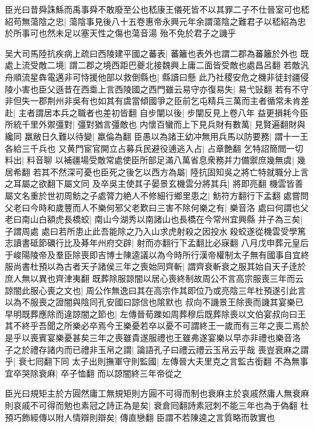 臣光曰昔舜誅鯀而禹事舜不敢廢至公也嵇康王儀死皆不以其罪二子不仕晉室可也嵇紹苟無蕩陰之忠|{
	蕩陰事見後八十五卷惠帝永興元年余謂蕩陰之難君子以嵇紹為忠於所事可也然未足以塞天性之傷也蕩音湯}
殆不免於君子之譏乎

吴大司馬陸抗疾病上疏曰西陵建平國之蕃表|{
	蕃籬也表外也謂二郡為蕃籬於外也}
既處上流受敵二境|{
	謂二郡之境西距巴夔北接魏興上庸二面皆受敵也處昌呂翻}
若敵汎舟順流星犇電邁非可恃援他部以救倒縣也|{
	縣讀曰懸}
此乃社稷安危之機非徒封疆侵陵小害也臣父遜昔在西埀上言西陵國之西門雖云易守亦復易失|{
	易弋䜴翻}
若有不守非但失一郡荆州非吳有也如其有虞當傾國爭之臣前乞屯精兵三萬而主者循常未肯差赴|{
	主者謂居本兵之職者也差初皆翻}
自步闡以後|{
	步闡反見上卷八年}
益更損耗今臣所統千里外禦彊對|{
	彊對猶言彊敵也}
内懷百蠻而上下見兵財有數萬|{
	見賢遍翻財與纔同}
羸敝日久難以待變|{
	羸倫為翻}
臣愚以為諸王幼冲無用兵馬以防要務|{
	謂十一王各給三千兵也}
又黄門宦官開立占募兵民避役逋逃入占|{
	占章艶翻}
乞特詔簡閲一切料出|{
	料音聊}
以補疆場受敵常處使臣所部足滿八萬省息衆務并力備禦庶幾無虞|{
	幾居希翻}
若其不然深可憂也臣死之後乞以西方為屬|{
	陸抗固知吳之將亡特就職分上言之耳屬之欲翻下屬文同}
及卒吳主使其子晏景玄機雲分將其兵|{
	將即亮翻}
機雲皆善屬文名重於世初周魴之子處膂力絶人不修細行鄉里患之|{
	魴符方翻行下孟翻}
處嘗問父老曰今時和歲豐而人不樂何邪父老歎曰三害不除何樂之有|{
	樂音洛}
處曰何謂也父老曰南山白額虎長橋蛟|{
	南山今湖秀以南諸山也長橋在今常州宜興縣}
并子為三矣|{
	子謂周處}
處曰若所患止此吾能除之乃入山求虎射殺之因投水殺蛟遂從機雲受學篤志讀書砥節礪行比及朞年州府交辟|{
	射而亦翻行下孟翻比必寐翻}
八月戊申葬元皇后于峻陽陵帝及羣臣除喪即吉博士陳逵議以為今時所行漢帝權制太子無有國事自宜終服尚書杜預以為古者天子諸侯三年之喪始同齊斬|{
	謂齊衰斬衰之服其始自天子逹於庶人無以異也齊津夷翻}
既葬除服諒闇以居心喪終制故周公不言高宗服喪三年而云諒闇此服心喪之文也|{
	周公作無逸曰其在高宗作其即位乃或亮陰三年杜預遂引此言以為不服喪之證闇與陰同孔安國曰諒信也隂默也}
叔向不譏景王除喪而譏其宴樂已早明既葬應除而違諒闇之節也|{
	左傳晉荀躒如周葬穆后既葬除喪以文伯宴叔向曰王其不終乎吾聞之所樂必卒焉今王樂憂若卒以憂不可謂終王一歲而有三年之喪二焉於是乎以喪賓宴樂憂甚矣三年之喪雖貴遂服禮也王雖弗遂宴樂以早亦非禮也樂音洛}
子之於禮存諸内而已禮非玉帛之謂|{
	論語孔子曰禮云禮云玉帛云乎哉}
喪豈衰麻之謂乎|{
	衰七囘翻下同}
太子出則撫軍守則監國|{
	左傳晉大夫里克之言監古銜翻}
不為無事宜卒哭除衰麻|{
	卒子恤翻}
而以諒闇終三年帝從之

臣光曰規矩主於方圓然庸工無規矩則方圓不可得而制也衰麻主於哀戚然庸人無衰麻則哀戚不可得而勉也素冠之詩正為是矣|{
	衰倉囘翻詩素冠刺不能三年也為于偽翻}
杜預巧飾經傳以附人情辯則辯矣|{
	傳直戀翻}
臣謂不若陳逵之言質略而敦實也

